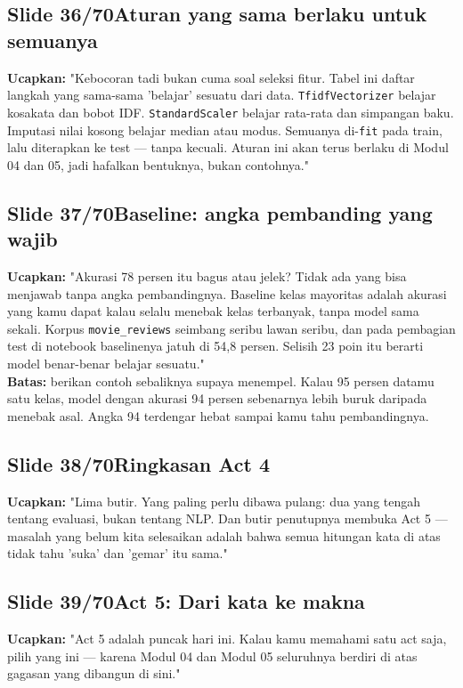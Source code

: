 \documentclass[11pt]{article}
\renewcommand{\framebox}[1]{\colorbox{acc!15}{\textcolor{acc}{\textbf{#1}}}}
\begin{document}
\subsection*{\framebox{Slide 36/70}\quad Aturan yang sama berlaku untuk semuanya}
\textbf{Ucapkan:} "Kebocoran tadi bukan cuma soal seleksi fitur. Tabel ini daftar langkah yang sama-sama 'belajar' sesuatu dari data. \texttt{TfidfVectorizer} belajar kosakata dan bobot IDF. \texttt{StandardScaler} belajar rata-rata dan simpangan baku. Imputasi nilai kosong belajar median atau modus. Semuanya di-\texttt{fit} pada train, lalu diterapkan ke test — tanpa kecuali. Aturan ini akan terus berlaku di Modul 04 dan 05, jadi hafalkan bentuknya, bukan contohnya."\\[2pt]

\subsection*{\framebox{Slide 37/70}\quad Baseline: angka pembanding yang wajib}
\textbf{Ucapkan:} "Akurasi 78 persen itu bagus atau jelek? Tidak ada yang bisa menjawab tanpa angka pembandingnya. Baseline kelas mayoritas adalah akurasi yang kamu dapat kalau selalu menebak kelas terbanyak, tanpa model sama sekali. Korpus \texttt{movie\_reviews} seimbang seribu lawan seribu, dan pada pembagian test di notebook baselinenya jatuh di 54,8 persen. Selisih 23 poin itu berarti model benar-benar belajar sesuatu."\\[2pt]
\textbf{Batas:} berikan contoh sebaliknya supaya menempel. Kalau 95 persen datamu satu kelas, model dengan akurasi 94 persen sebenarnya lebih buruk daripada menebak asal. Angka 94 terdengar hebat sampai kamu tahu pembandingnya.\\[2pt]

\subsection*{\framebox{Slide 38/70}\quad Ringkasan Act 4}
\textbf{Ucapkan:} "Lima butir. Yang paling perlu dibawa pulang: dua yang tengah tentang evaluasi, bukan tentang NLP. Dan butir penutupnya membuka Act 5 — masalah yang belum kita selesaikan adalah bahwa semua hitungan kata di atas tidak tahu 'suka' dan 'gemar' itu sama."\\[2pt]

\subsection*{\framebox{Slide 39/70}\quad Act 5: Dari kata ke makna}
\textbf{Ucapkan:} "Act 5 adalah puncak hari ini. Kalau kamu memahami satu act saja, pilih yang ini — karena Modul 04 dan Modul 05 seluruhnya berdiri di atas gagasan yang dibangun di sini."\\[2pt]
\end{document}
